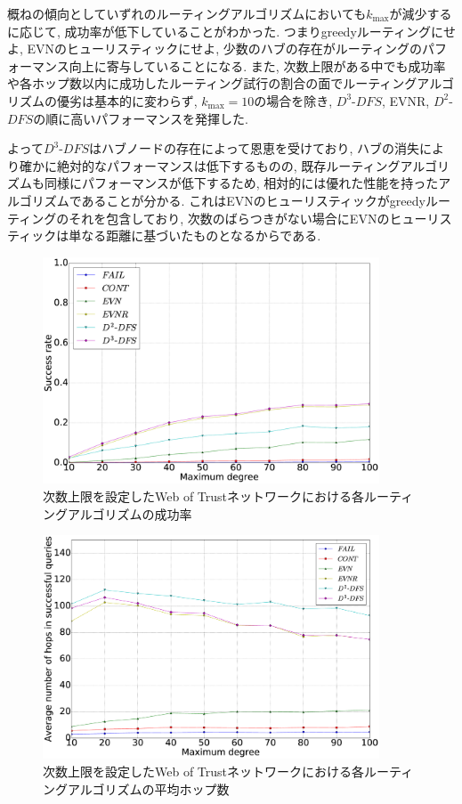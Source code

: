 \documentclass[dvipdfmx]{ampbt}
\begin{document}
   概ねの傾向としていずれのルーティングアルゴリズムにおいても$k_{\max}$が減少するに応じて, 成功率が低下していることがわかった. つまりgreedyルーティングにせよ, EVNのヒューリスティックにせよ, 少数のハブの存在がルーティングのパフォーマンス向上に寄与していることになる. また, 次数上限がある中でも成功率や各ホップ数以内に成功したルーティング試行の割合の面でルーティングアルゴリズムの優劣は基本的に変わらず, $k_{\max}=10$の場合を除き, $D^3$-$DFS$, EVNR, $D^2$-$DFS$の順に高いパフォーマンスを発揮した.

   よって$D^3$-$DFS$はハブノードの存在によって恩恵を受けており, ハブの消失により確かに絶対的なパフォーマンスは低下するものの, 既存ルーティングアルゴリズムも同様にパフォーマンスが低下するため, 相対的には優れた性能を持ったアルゴリズムであることが分かる. これはEVNのヒューリスティックがgreedyルーティングのそれを包含しており, 次数のばらつきがない場合にEVNのヒューリスティックは単なる距離に基づいたものとなるからである.

   \begin{figure}[htbp]
    \centerline{\includegraphics[width=100mm]{../fig/clip_succ.eps}}
    \caption{次数上限を設定したWeb of Trustネットワークにおける各ルーティングアルゴリズムの成功率}
    \label{fig:clip_succ}
   \end{figure}

   \begin{figure}[htbp]
    \centerline{\includegraphics[width=100mm]{../fig/clip_hops.eps}}
    \caption{次数上限を設定したWeb of Trustネットワークにおける各ルーティングアルゴリズムの平均ホップ数}
    \label{fig:clip_hops}
   \end{figure}
\end{document}
